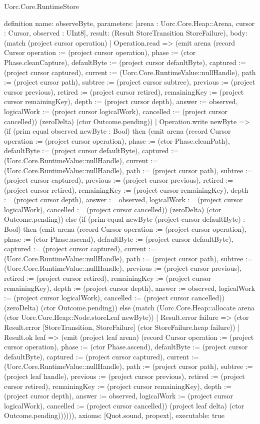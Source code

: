 \begin{lexlean}{Uorc.Core.RuntimeStore}
\begin{semanticmodule}
definition{
  name: observeByte,
  parameters: [arena : Uorc.Core.Heap::Arena, cursor : Cursor, observed : UInt8],
  result: (Result StoreTransition StoreFailure),
  body: (match (project cursor operation)
    | Operation.read => (emit arena (record Cursor {operation := (project cursor operation), phase := (ctor Phase.cleanCapture), defaultByte := (project cursor defaultByte), captured := (project cursor captured), current := (Uorc.Core.RuntimeValue::nullHandle), path := (project cursor path), subtree := (project cursor subtree), previous := (project cursor previous), retired := (project cursor retired), remainingKey := (project cursor remainingKey), depth := (project cursor depth), answer := observed, logicalWork := (project cursor logicalWork), cancelled := (project cursor cancelled)}) (zeroDelta) (ctor Outcome.pending))
    | Operation.write newByte => (if (prim equal observed newByte : Bool) then (emit arena (record Cursor {operation := (project cursor operation), phase := (ctor Phase.cleanPath), defaultByte := (project cursor defaultByte), captured := (Uorc.Core.RuntimeValue::nullHandle), current := (Uorc.Core.RuntimeValue::nullHandle), path := (project cursor path), subtree := (project cursor captured), previous := (project cursor previous), retired := (project cursor retired), remainingKey := (project cursor remainingKey), depth := (project cursor depth), answer := observed, logicalWork := (project cursor logicalWork), cancelled := (project cursor cancelled)}) (zeroDelta) (ctor Outcome.pending)) else (if (prim equal newByte (project cursor defaultByte) : Bool) then (emit arena (record Cursor {operation := (project cursor operation), phase := (ctor Phase.ascend), defaultByte := (project cursor defaultByte), captured := (project cursor captured), current := (Uorc.Core.RuntimeValue::nullHandle), path := (project cursor path), subtree := (Uorc.Core.RuntimeValue::nullHandle), previous := (project cursor previous), retired := (project cursor retired), remainingKey := (project cursor remainingKey), depth := (project cursor depth), answer := observed, logicalWork := (project cursor logicalWork), cancelled := (project cursor cancelled)}) (zeroDelta) (ctor Outcome.pending)) else (match (Uorc.Core.Heap::allocate arena (ctor Uorc.Core.Heap::Node.storeLeaf newByte))
      | Result.error failure => (ctor Result.error [StoreTransition, StoreFailure] (ctor StoreFailure.heap failure))
      | Result.ok leaf => (emit (project leaf arena) (record Cursor {operation := (project cursor operation), phase := (ctor Phase.ascend), defaultByte := (project cursor defaultByte), captured := (project cursor captured), current := (Uorc.Core.RuntimeValue::nullHandle), path := (project cursor path), subtree := (project leaf handle), previous := (project cursor previous), retired := (project cursor retired), remainingKey := (project cursor remainingKey), depth := (project cursor depth), answer := observed, logicalWork := (project cursor logicalWork), cancelled := (project cursor cancelled)}) (project leaf delta) (ctor Outcome.pending)))))),
  axioms: [Quot.sound, propext],
  executable: true
}


\end{semanticmodule}
\end{lexlean}

